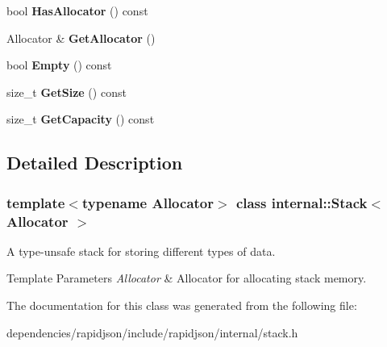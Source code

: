 \begin{DoxyCompactItemize}
\mbox{\label{classinternal_1_1_stack_a657ae4d477b25d4e0045aee0efd809c3}} 
bool {\bfseries Has\+Allocator} () const
\item 
\mbox{\label{classinternal_1_1_stack_ab01f693833dfe136f574d66547623cfa}} 
Allocator \& {\bfseries Get\+Allocator} ()
\item 
\mbox{\label{classinternal_1_1_stack_a2b8bda380e33838a99e3c73ff9785f03}} 
bool {\bfseries Empty} () const
\item 
\mbox{\label{classinternal_1_1_stack_ac484468a2791bd3e9ba609bd1600ab48}} 
size\+\_\+t {\bfseries Get\+Size} () const
\item 
\mbox{\label{classinternal_1_1_stack_a67d5d7ee9424d3dd46cf9d001b6cdc6b}} 
size\+\_\+t {\bfseries Get\+Capacity} () const
\end{DoxyCompactItemize}


\subsection{Detailed Description}
\subsubsection*{template$<$typename Allocator$>$\newline
class internal\+::\+Stack$<$ Allocator $>$}

A type-\/unsafe stack for storing different types of data. 


\begin{DoxyTemplParams}{Template Parameters}
{\em Allocator} & Allocator for allocating stack memory. \\
\hline
\end{DoxyTemplParams}


The documentation for this class was generated from the following file\+:\begin{DoxyCompactItemize}
\item 
dependencies/rapidjson/include/rapidjson/internal/stack.\+h\end{DoxyCompactItemize}
